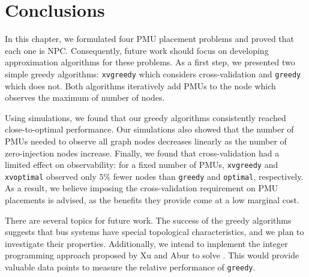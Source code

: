 \section{Conclusions}
\label{sec:pmu-conclude}

In this chapter, we formulated four PMU placement problems and proved that each one is NPC. 
Consequently, future work should focus on developing approximation algorithms for these problems.  As a first step, we presented two simple greedy algorithms:
{\tt xvgreedy} which considers cross-validation and {\tt greedy} which does not.  Both algorithms iteratively add PMUs to the node which observes the maximum of number of nodes. 

Using simulations, we found that our greedy algorithms consistently reached close-to-optimal performance.  Our simulations also
showed that the number of PMUs needed to observe all graph nodes decreases linearly as the number of zero-injection nodes increase. Finally, we found
that cross-validation had a limited effect on observability: for a fixed number of PMUs, {\tt xvgreedy} and {\tt xvoptimal} observed only $5\%$ fewer nodes than
{\tt greedy} and {\tt optimal}, respectively. As a result, we believe imposing the cross-validation requirement on PMU placements is advised, as the benefits they provide come at a low marginal cost.


There are several topics for future work. The success of the greedy algorithms suggests that bus systems have special topological characteristics, 
and we plan to investigate their properties. Additionally, we intend to implement the integer programming approach proposed by Xu and Abur \cite{Xu04} to solve \fulls.  This would
provide valuable data points to measure the relative performance of {\tt greedy}.


